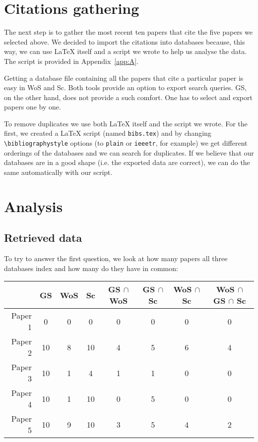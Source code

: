 \documentclass{lmcs}
\newenvironment{centeredData}{%
    \medskip%
    \begin{center}%
}{%
    \end{center}%
    \medskip%
}
\begin{document}
\section{Citations gathering}

The next step is to gather the most recent ten papers that cite the five papers we selected above. We decided to import the citations into \BibTeX{} databases because, this way, we can use \LaTeX{} itself and a script we wrote to help us analyse the data. The script is provided in Appendix~\ref{app:A}.

Getting a \BibTeX{} database file containing all the papers that cite a particular paper is easy in WoS and Sc. Both tools provide an option to export search queries. GS, on the other hand, does not provide a such comfort. One has to select and export papers one by one.

To remove duplicates we use both \LaTeX{} itself and the script we wrote. For the first, we created a \LaTeX{} script (named \texttt{bibs.tex}) and by changing \texttt{\textbackslash bibliographystyle} options (to \texttt{plain} or \texttt{ieeetr}, for example) we get different orderings of the \BibTeX{} databases and we can search for duplicates. If we believe that our databases are in a good shape (i.e. the exported data are correct), we can do the same automatically with our script.


\section{Analysis}

\subsection{Retrieved data}
To try to answer the first question, we look at how many papers all three databases index and how many do they have in common:

\begin{centeredData}
\begin{tabular}{r|c c c|c c c|c}
         & GS &  WoS & Sc & GS $\cap$ WoS & GS $\cap$ Sc & WoS $\cap$ Sc & WoS $\cap$ GS $\cap$ Sc \\
\hline
Paper 1  &  0 & 0 &  0 & 0 & 0 & 0 & 0 \\
Paper 2  & 10 & 8 & 10 & 4 & 5 & 6 & 4 \\
Paper 3  & 10 & 1 &  4 & 1 & 1 & 0 & 0 \\
Paper 4  & 10 & 1 & 10 & 0 & 5 & 0 & 0 \\
Paper 5  & 10 & 9 & 10 & 3 & 5 & 4 & 2
\end{tabular}
\end{centeredData}
\end{document}
